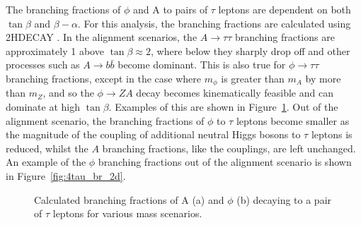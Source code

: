 The branching fractions of $\phi$ and A to pairs of $\tau$ leptons are dependent on both $\tan\beta$ and $\beta-\alpha$.
For this analysis, the branching fractions are calculated using \textsc{2HDECAY} \cite{Krause:2018wmo}.
In the alignment scenarios, the $A\rightarrow\tau\tau$ branching fractions are approximately 1 above $\tan\beta \approx 2$, where below they sharply drop off and other processes such as $A\rightarrow b\bar{b}$ become dominant.
This is also true for $\phi\rightarrow\tau\tau$ branching fractions, except in the case where $m_\phi$ is greater than $m_A$ by more than $m_Z$, and so the $\phi\rightarrow ZA$ decay becomes kinematically feasible and can dominate at high $\tan\beta$.
Examples of this are shown in Figure~\ref{fig:4tau_br_1d}.
Out of the alignment scenario, the branching fractions of $\phi$ to $\tau$ leptons become smaller as the magnitude of the coupling of additional neutral Higgs bosons to $\tau$ leptons is reduced, whilst the $A$ branching fractions, like the couplings, are left unchanged.
An example of the $\phi$ branching fractions out of the alignment scenario is shown in Figure~\ref{fig:4tau_br_2d}.

\begin{figure}[!hbtp]
\centering
\caption[Plots of the branching fractions $\phi$ and A to pairs of $\tau$ leptons in the alignment scenario.]{Calculated branching fractions of A (a) and $\phi$ (b) decaying to a pair of $\tau$ leptons for various mass scenarios.}
\label{fig:4tau_br_1d}
\end{figure}

